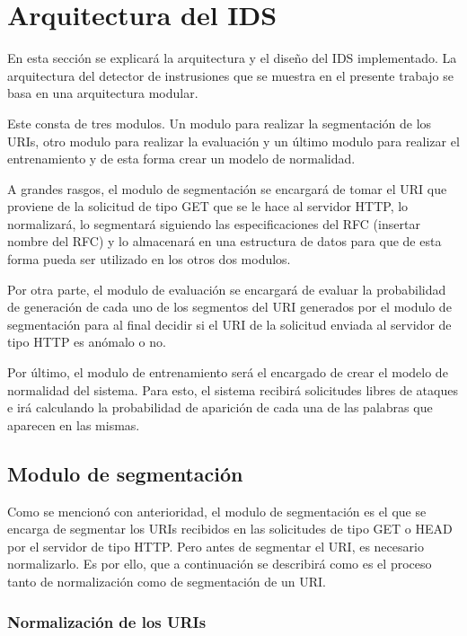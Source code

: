 \chapter{Arquitectura del IDS}
\label{capitulo3}

En esta sección se explicará la arquitectura y el diseño del IDS implementado. 
La arquitectura del detector de instrusiones que se muestra en el presente trabajo se basa en una arquitectura modular.

Este consta de tres modulos. Un modulo para realizar la segmentación de los URIs, otro modulo para realizar la evaluación y un último modulo para realizar el entrenamiento y de esta forma crear un modelo de normalidad.

A grandes rasgos, el modulo de segmentación se encargará de tomar el URI que proviene de la solicitud de tipo GET que se le hace al servidor HTTP, lo normalizará, lo segmentará siguiendo las especificaciones del RFC (insertar nombre del RFC) y lo almacenará en una estructura de datos para que de esta forma pueda ser utilizado en los otros dos modulos.

Por otra parte, el modulo de evaluación se encargará de evaluar la probabilidad de generación de cada uno de los segmentos del URI generados por el modulo de segmentación para al final decidir si el URI de la solicitud enviada al servidor de tipo HTTP es anómalo o no.

Por último, el modulo de entrenamiento será el encargado de crear el modelo de normalidad del sistema. Para esto, el sistema recibirá solicitudes libres de ataques e irá calculando la probabilidad de aparición de cada una de las palabras que aparecen en las mismas.

\section{Modulo de segmentación}

Como se mencionó con anterioridad, el modulo de segmentación es el que se encarga de segmentar los URIs recibidos en las solicitudes de tipo GET o HEAD por el servidor de tipo HTTP. Pero antes de segmentar el URI, es necesario normalizarlo. Es por ello, que a continuación se describirá como es el proceso tanto de normalización como de segmentación de un URI.

\subsection{Normalización de los URIs}

